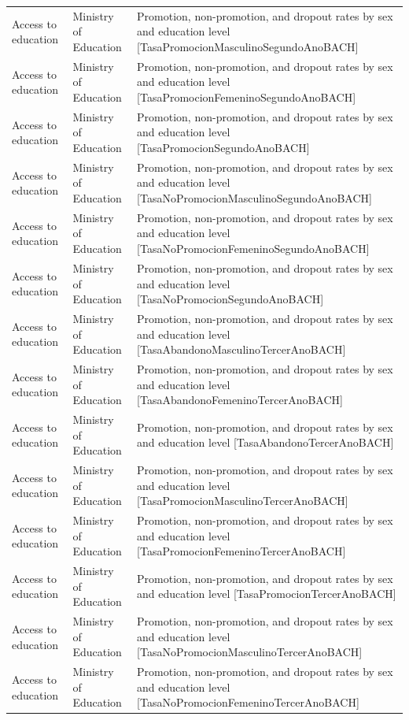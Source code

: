 \documentclass[10pt,a4paper]{article}
\begin{document}
\begin{longtable}{@{}>{\raggedright\arraybackslash}p{3.5cm}>{\raggedright\arraybackslash}p{5.6cm}>{\raggedright\arraybackslash}p{\dimexpr\textwidth-9.1cm-4\tabcolsep\relax}@{}}
Access to education & Ministry of Education & Promotion, non-promotion, and dropout rates by sex and education level [TasaPromocionMasculinoSegundoAnoBACH]\\
Access to education & Ministry of Education & Promotion, non-promotion, and dropout rates by sex and education level [TasaPromocionFemeninoSegundoAnoBACH]\\
Access to education & Ministry of Education & Promotion, non-promotion, and dropout rates by sex and education level [TasaPromocionSegundoAnoBACH]\\
Access to education & Ministry of Education & Promotion, non-promotion, and dropout rates by sex and education level [TasaNoPromocionMasculinoSegundoAnoBACH]\\
Access to education & Ministry of Education & Promotion, non-promotion, and dropout rates by sex and education level [TasaNoPromocionFemeninoSegundoAnoBACH]\\
Access to education & Ministry of Education & Promotion, non-promotion, and dropout rates by sex and education level [TasaNoPromocionSegundoAnoBACH]\\
Access to education & Ministry of Education & Promotion, non-promotion, and dropout rates by sex and education level [TasaAbandonoMasculinoTercerAnoBACH]\\
Access to education & Ministry of Education & Promotion, non-promotion, and dropout rates by sex and education level [TasaAbandonoFemeninoTercerAnoBACH]\\
Access to education & Ministry of Education & Promotion, non-promotion, and dropout rates by sex and education level [TasaAbandonoTercerAnoBACH]\\
Access to education & Ministry of Education & Promotion, non-promotion, and dropout rates by sex and education level [TasaPromocionMasculinoTercerAnoBACH]\\
Access to education & Ministry of Education & Promotion, non-promotion, and dropout rates by sex and education level [TasaPromocionFemeninoTercerAnoBACH]\\
Access to education & Ministry of Education & Promotion, non-promotion, and dropout rates by sex and education level [TasaPromocionTercerAnoBACH]\\
Access to education & Ministry of Education & Promotion, non-promotion, and dropout rates by sex and education level [TasaNoPromocionMasculinoTercerAnoBACH]\\
Access to education & Ministry of Education & Promotion, non-promotion, and dropout rates by sex and education level [TasaNoPromocionFemeninoTercerAnoBACH]\\

\end{longtable}
\end{document}
